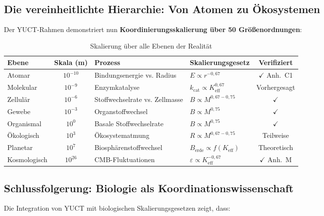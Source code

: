 \documentclass[12pt]{article}
\newcommand{\Keff}{K_{\mathrm{eff}}}
\begin{document}
	\subsection{Die vereinheitlichte Hierarchie: Von Atomen zu Ökosystemen}
	
	Der YUCT-Rahmen demonstriert nun \textbf{Koordinierungsskalierung über 50 Größenordnungen}:
	
	\begin{table}[htbp]
		\centering
		\caption{Skalierung über alle Ebenen der Realität}
		\label{tab:unified-hierarchy}
		\begin{tabular}{p{3cm} c p{4cm} p{3cm} c}
			\toprule
			\textbf{Ebene} & \textbf{Skala (m)} & \textbf{Prozess} & \textbf{Skalierungsgesetz} & \textbf{Verifiziert} \\
			\midrule
			Atomar      & \(10^{-10}\) & Bindungsenergie vs. Radius & \(E \propto r^{-0,67}\) & $\checkmark$ Anh.~C1 \\
			Molekular   & \(10^{-9}\)  & Enzymkatalyse        & \(k_{\text{cat}} \propto \Keff^{0,67}\) & Vorhergesagt \\
			Zellulär    & \(10^{-6}\)  & Stoffwechselrate vs. Zellmasse & \(B \propto M^{0,67-0,75}\) & $\checkmark$ \cite{Takemoto2015} \\
			Gewebe      & \(10^{-3}\)  & Organstoffwechsel        & \(B \propto M^{0,75}\) & $\checkmark$ \cite{West2002} \\
			Organismal  & \(10^{0}\)   & Basale Stoffwechselrate    & \(B \propto M^{0,75}\) & $\checkmark$ \cite{Kleiber1932} \\
			Ökologisch  & \(10^{3}\)   & Ökosystematmung   & \(R \propto M^{0,67-0,75}\) & Teilweise \\
			Planetar    & \(10^{7}\)   & Biosphärenstoffwechsel    & \(B_{\text{erde}} \propto f(\Keff)\) & Theoretisch \\
			Kosmologisch& \(10^{26}\)  & CMB-Fluktuationen        & \(\varepsilon \propto \Keff^{-0,67}\) & $\checkmark$ Anh.~M \\
			\bottomrule
		\end{tabular}
	\end{table}
	
	\subsection{Schlussfolgerung: Biologie als Koordinationswissenschaft}
	
	Die Integration von YUCT mit biologischen Skalierungsgesetzen zeigt, dass:
	
\end{document}
